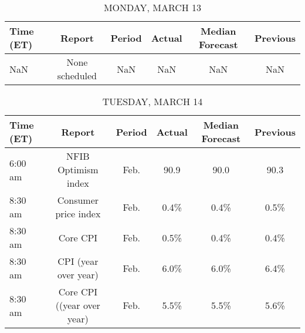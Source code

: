 \documentclass{article}%
\begin{document}
%
\normalsize%


\begin{table}[htbp]%
\caption{MONDAY, MARCH 13}%
\centering%
\begin{adjustbox}{width=1\textwidth}%
\begin{tabular}{lccccc}
\toprule
Time (ET) &         Report & Period & Actual & Median Forecast & Previous \\
\midrule
      NaN & None scheduled &    NaN &    NaN &             NaN &      NaN \\
\bottomrule
\end{tabular}
%
\end{adjustbox}%
\end{table}

%


\begin{table}[htbp]%
\caption{TUESDAY, MARCH 14}%
\centering%
\begin{adjustbox}{width=1\textwidth}%
\begin{tabular}{lccccc}
\toprule
Time (ET) &                     Report & Period & Actual & Median Forecast & Previous \\
\midrule
  6:00 am &        NFIB Optimism index &   Feb. &   90.9 &            90.0 &     90.3 \\
  8:30 am &       Consumer price index &   Feb. &   0.4\% &            0.4\% &     0.5\% \\
  8:30 am &                   Core CPI &   Feb. &   0.5\% &            0.4\% &     0.4\% \\
  8:30 am &       CPI (year over year) &   Feb. &   6.0\% &            6.0\% &     6.4\% \\
  8:30 am & Core CPI ((year over year) &   Feb. &   5.5\% &            5.5\% &     5.6\% \\
\bottomrule
\end{tabular}
%
\end{adjustbox}%
\end{table}

%
\end{document}

